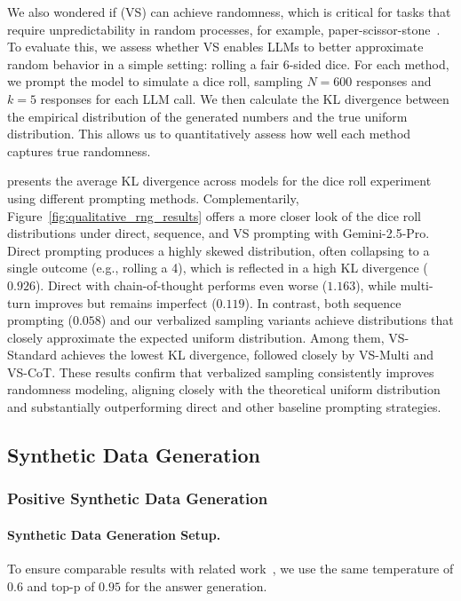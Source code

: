 We also wondered if \ours (VS) can achieve randomness, which is critical for tasks that require unpredictability in random processes, for example, paper-scissor-stone~\citep{west_base_2025}.
To evaluate this, we assess whether VS enables LLMs to better approximate random behavior in a simple setting: rolling a fair 6-sided dice. For each method, we prompt the model to simulate a dice roll, sampling $N=600$ responses and $k=5$ responses for each LLM call. We then calculate the KL divergence between the empirical distribution of the generated numbers and the true uniform distribution. This allows us to quantitatively assess how well each method captures true randomness. 

 presents the average KL divergence across models for the dice roll experiment using different prompting methods. Complementarily, Figure~\ref{fig:qualitative_rng_results} offers a more closer look of the dice roll distributions under direct, sequence, and VS prompting with Gemini-2.5-Pro.
Direct prompting produces a highly skewed distribution, often collapsing to a single outcome (e.g., rolling a 4), which is reflected in a high KL divergence ($0.926$). Direct with chain-of-thought performs even worse ($1.163$), while multi-turn improves but remains imperfect ($0.119$). In contrast, both sequence prompting ($0.058$) and our verbalized sampling variants achieve distributions that closely approximate the expected uniform distribution. Among them, VS-Standard achieves the lowest KL divergence, followed closely by VS-Multi and VS-CoT. These results confirm that verbalized sampling consistently improves randomness modeling, aligning closely with the theoretical uniform distribution and substantially outperforming direct and other baseline prompting strategies.


\newpage
\subsection{Synthetic Data Generation}\label{appendix:synthetic_data}

\subsubsection{Positive Synthetic Data Generation}
\label{appendix:positive data}

\paragraph{Synthetic Data Generation Setup.} To ensure comparable results with related work~\citep{liu2025understandingr1zeroliketrainingcritical}, we use the same temperature of $0.6$ and top-p of $0.95$ for the answer generation.

